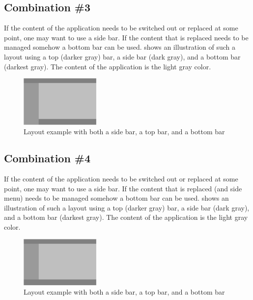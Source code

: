 \FloatBarrier

\subsection{Combination \#3}
If the content of the application needs to be switched out or replaced at some point, one may want to use a side bar. If the content that is replaced needs to be managed somehow a bottom bar can be used.  shows an illustration of such a layout using a top (darker gray) bar, a side bar (dark gray), and a bottom bar (darkest gray). The content of the application is the light gray color.

\begin{figure}[!htbp]
    \centering
    \includegraphics[width=0.35\textwidth]{pictures/application_structure/bar_combinations_3}
    \caption{Layout example with both a side bar, a top bar, and a bottom bar}
    \label{fig:bar_combinations_3}
\end{figure}

\FloatBarrier

\subsection{Combination \#4}
If the content of the application needs to be switched out or replaced at some point, one may want to use a side bar. If the content that is replaced (and side menu) needs to be managed somehow a bottom bar can be used.  shows an illustration of such a layout using a top (darker gray) bar, a side bar (dark gray), and a bottom bar (darkest gray). The content of the application is the light gray color.


\begin{figure}[!htbp]
    \centering
    \includegraphics[width=0.35\textwidth]{pictures/application_structure/bar_combinations_4}
    \caption{Layout example with both a side bar, a top bar, and a bottom bar}
    \label{fig:bar_combinations_4}
\end{figure}



